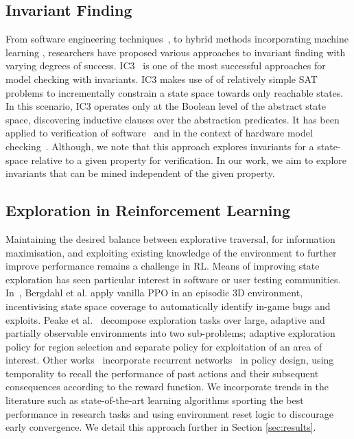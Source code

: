 \documentclass[runningheads]{llncs}
\begin{document}
\subsection{Invariant Finding}
From software engineering techniques~\cite{case2007automated, bensalem1996powerful}, to hybrid methods incorporating machine learning \cite{garg2016learning}, researchers have proposed various approaches to invariant finding with varying degrees of success. 
IC3~\cite{bradley11} is one of the most successful approaches for model checking with invariants. IC3 makes use of of relatively simple SAT problems to incrementally constrain a state space towards only reachable states. In this scenario, IC3 operates only at the Boolean level of the abstract state space, discovering inductive clauses over the abstraction predicates. It has been applied to verification of software~\cite{cimatti12} and in the context of hardware model checking~\cite{bradley07}. Although, we note that this approach explores invariants for a state-space relative to a given property for verification. In our work, we aim to explore invariants that can be mined independent of the given property.


\subsection{Exploration in Reinforcement Learning} 
Maintaining the desired balance between explorative traversal, for information maximisation, and exploiting existing knowledge of the environment to further improve performance remains a challenge in RL. Means of improving state exploration has seen particular interest in software or user testing communities. In~\cite{9231552}, Bergdahl et al. apply vanilla PPO in an episodic 3D environment, incentivising state space coverage to automatically identify in-game bugs and exploits. Peake et al.~\cite{9476756} decompose exploration tasks over large, adaptive and partially observable environments into two sub-problems; adaptive exploration policy for region selection and separate policy for exploitation of an area of interest. Other works~\cite{s21041067} incorporate recurrent networks~\cite{medsker2001recurrent} in policy design, using temporality to recall the performance of past actions and their subsequent consequences according to the reward function. We incorporate trends in the literature such as state-of-the-art learning algorithms sporting the best performance in research tasks and using environment reset logic to discourage early convergence. We detail this approach further in Section \ref{sec:results}.
\end{document}
